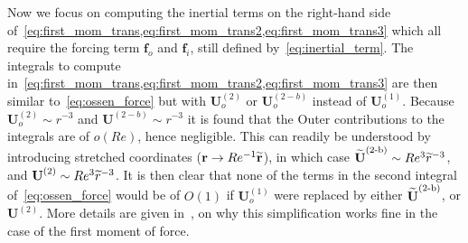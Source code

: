 Now we focus on computing the inertial terms on the right-hand side of~\ref{eq:first_mom_trans,eq:first_mom_trans2,eq:first_mom_trans3} which all require the forcing term $\textbf{f}_o$ and $\textbf{f}_i$, still defined by~\ref{eq:inertial_term}. 
The integrals to compute in~\ref{eq:first_mom_trans,eq:first_mom_trans2,eq:first_mom_trans3} are then similar to~\ref{eq:ossen_force} but with $\textbf{U}_o^{(2)}$ or $\textbf{U}_o^{(2-b)}$ instead of $\textbf{U}_o^{(1)}$. 
Because $\textbf{U}_o^{(2)}\sim r^{-3}$ and $\textbf{U}^{(2-b)}\sim r^{-3}$  it is found that the Outer contributions to the integrals are of $o(Re)$, hence negligible. 
This can readily be understood by introducing stretched coordinates ($\textbf{r}\to Re^{-1} \widetilde{\textbf{r}}$), in which case $\widetilde{\textbf{U}}^\text{(2-b)}\sim Re^3 \widetilde{r}^{-3}$, and $\textbf{U}^{(2)}\sim Re^3 \widetilde{r}^{-3}$. 
It is then clear that none of the terms in the second integral of~\ref{eq:ossen_force} would be of $O(1)$ if $\textbf{U}_o^{(1)}$ were replaced by either $\widetilde{\textbf{U}}^\text{(2-b)}$, or $\textbf{U}^{(2)}$.  
More details are given in~\citet{stone2001inertial,raja2010inertial}, on why this simplification works fine in the case of the first moment of force. 

